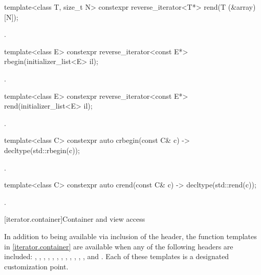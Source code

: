 %
\begin{itemdecl}
template<class T, size_t N> constexpr reverse_iterator<T*> rend(T (&array)[N]);
\end{itemdecl}
\begin{itemdescr}
\pnum \returns {}.
\end{itemdescr}

%
\begin{itemdecl}
template<class E> constexpr reverse_iterator<const E*> rbegin(initializer_list<E> il);
\end{itemdecl}
\begin{itemdescr}
\pnum \returns {}.
\end{itemdescr}

%
\begin{itemdecl}
template<class E> constexpr reverse_iterator<const E*> rend(initializer_list<E> il);
\end{itemdecl}
\begin{itemdescr}
\pnum \returns {}.
\end{itemdescr}

%
\begin{itemdecl}
template<class C> constexpr auto crbegin(const C& c) -> decltype(std::rbegin(c));
\end{itemdecl}
\begin{itemdescr}
\pnum \returns {}.
\end{itemdescr}

%
\begin{itemdecl}
template<class C> constexpr auto crend(const C& c) -> decltype(std::rend(c));
\end{itemdecl}
\begin{itemdescr}
\pnum \returns {}.
\end{itemdescr}

[iterator.container]{Container and view access}

\pnum
In addition to being available via inclusion of the  header,
the function templates in \ref{iterator.container} are available
when any of the following headers are included:
, , , ,
, , , , ,
, , , and .
Each of these templates
is a designated customization point.

